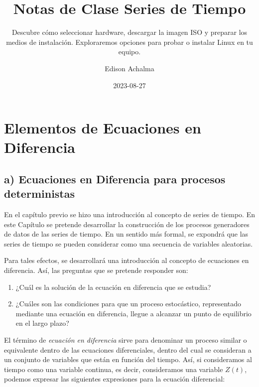 \documentclass[
  a4paper,
]{article}
\title{Notas de Clase Series de Tiempo}
\subtitle{Descubre cómo seleccionar hardware, descargar la imagen ISO y
preparar los medios de instalación. Exploraremos opciones para probar o
instalar Linux en tu equipo.}
\author{Edison Achalma}
\date{2023-08-27}
\begin{document}
\maketitle
\ifdefined\Shaded\renewenvironment{Shaded}{\begin{tcolorbox}[enhanced, frame hidden, boxrule=0pt, sharp corners, borderline west={3pt}{0pt}{shadecolor}, interior hidden, breakable]}{\end{tcolorbox}}\fi

\hypertarget{elementos-de-ecuaciones-en-diferencia}{%
\section{Elementos de Ecuaciones en
Diferencia}\label{elementos-de-ecuaciones-en-diferencia}}

\hypertarget{a-ecuaciones-en-diferencia-para-procesos-deterministas}{%
\subsection{a) Ecuaciones en Diferencia para procesos
deterministas}\label{a-ecuaciones-en-diferencia-para-procesos-deterministas}}

En el capítulo previo se hizo una introducción al concepto de series de
tiempo. En este Capítulo se pretende desarrollar la construcción de los
procesos generadores de datos de las series de tiempo. En un sentido más
formal, se expondrá que las series de tiempo se pueden considerar como
una secuencia de variables aleatorias.

Para tales efectos, se desarrollará una introducción al concepto de
ecuaciones en diferencia. Así, las preguntas que se pretende responder
son:

\begin{enumerate}
\def\labelenumi{\alph{enumi}.}
\item
  ¿Cuál es la solución de la ecuación en diferencia que se estudia?
\item
  ¿Cuáles son las condiciones para que un proceso estocástico,
  representado mediante una ecuación en diferencia, llegue a alcanzar un
  punto de equilibrio en el largo plazo?
\end{enumerate}

El término de \emph{ecuación en diferencia} sirve para denominar un
proceso similar o equivalente dentro de las ecuaciones diferenciales,
dentro del cual se consideran a un conjunto de variables que están en
función del tiempo. Así, si consideramos al tiempo como una variable
continua, es decir, consideramos una variable \(Z(t)\), podemos expresar
las siguientes expresiones para la ecuación diferencial:
\end{document}
